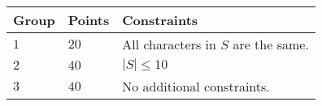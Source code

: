 \noindent
\begin{tabular}{| l | l | p{12cm} |}
  \hline
  \textbf{Group} & \textbf{Points} & \textbf{Constraints} \\ \hline
  $1$    & $20$      & All characters in $S$ are the same. \\ \hline
  $2$    & $40$      & $|S| \leq 10$ \\ \hline
  $3$    & $40$      & No additional constraints. \\ \hline
\end{tabular}
